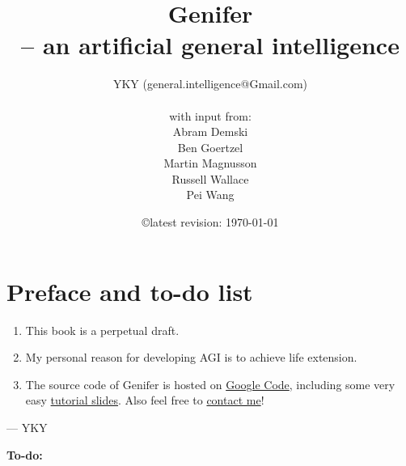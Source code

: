 \documentclass[12pt, a4paper]{report}
\title{\textbf{Genifer\\-- an artificial general intelligence}}
\author{YKY (general.intelligence@Gmail.com)\\ \\
with input from:\\
Abram Demski\\
Ben Goertzel\\
Martin Magnusson\\
Russell Wallace\\
Pei Wang
}
\date{\copyright \quad latest revision: \today}
\begin{document}
\renewcommand{\normalsize}{\fontsize{13pt}{15pt}\selectfont}
\fontsize{13pt}{15pt} \selectfont


\maketitle
\dominitoc

\setcounter{chapter}{-1}
\chapter{Preface and to-do list}

\begin{enumerate}

\item  This book is a perpetual draft.

\item  My personal reason for developing AGI is to achieve life extension.

\item  The source code of $\mbox{Genifer}$ is hosted on \href{http://code.google.com/p/genifer/}{Google Code}, including some very easy \href{http://code.google.com/p/genifer/downloads/list}{tutorial slides}.  Also feel free to \href{mailto:Generic.Intelligence@Gmail.com}{contact me}!

\end{enumerate}

\begin{flushright}
--- YKY
\end{flushright}

\color{TodoColor}

{\sffamily\bfseries\Huge To-do:}
\end{document}
